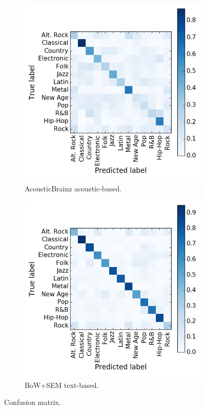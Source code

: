 \begin{figure}[ht!]
    \centering
    \begin{subfigure}{.45\textwidth}
        \centering
        \includegraphics[width=\linewidth]{ch06_similarity_pics/confusion_audio.png}
    	\caption{AcousticBrainz acoustic-based.}
    \end{subfigure}
    \begin{subfigure}{.45\textwidth}
        \centering
        \includegraphics[width=\linewidth]{ch06_similarity_pics/confusion_text.png}
		\caption{BoW+SEM text-based.}
    \end{subfigure}
    \caption{Confusion matrix.}
	\label{fig:similarity:confusion}
\end{figure}

